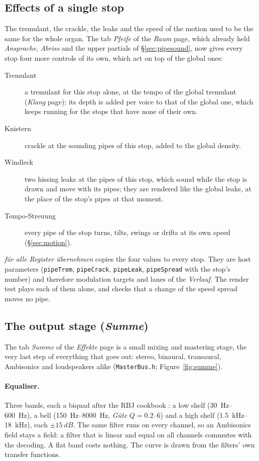 \documentclass[11pt,a4paper,parskip=half,DIV=11,toc=bibliography]{scrartcl}
\newcommand{\ui}[1]{\emph{#1}}                 %
\newcommand{\fn}[1]{\mbox{\texttt{#1}}}
\begin{document}
\subsection{Effects of a single stop}
\label{sec:stopfx}
The tremulant, the crackle, the leaks and the speed of the motion used to be the same for the whole organ. The tab \ui{Pfeife} of the \ui{Raum} page,
which already held \ui{Ansprache}, \ui{Abriss} and the upper partials of \S\ref{sec:pipesound}, now gives every stop four more controls of its own,
which act on top of the global ones:
\begin{description}
  \item[Tremulant] a tremulant for this stop alone, at the tempo of the global tremulant (\ui{Klang} page); its depth is added per voice to that of the
        global one, which keeps running for the stops that have none of their own.
  \item[Knistern] crackle at the sounding pipes of this stop, added to the global density.
  \item[Windleck] two hissing leaks at the pipes of this stop, which sound while the stop is drawn and move with its pipes; they are rendered like
        the global leaks, at the place of the stop's pipes at that moment.
  \item[Tempo-Streuung] every pipe of the stop turns, tilts, swings or drifts at its own speed (\S\ref{sec:motion}).
\end{description}
\ui{für alle Register übernehmen} copies the four values to every stop. They are host parameters (\fn{pipeTrem}, \fn{pipeCrack}, \fn{pipeLeak},
\fn{pipeSpread} with the stop's number) and therefore modulation targets and lanes of the \ui{Verlauf}. The render test plays each of them alone,
and checks that a change of the speed spread moves no pipe.

\subsection{The output stage (\ui{Summe})}
\label{sec:summe}
The tab \ui{Summe} of the \ui{Effekte} page is a small mixing and mastering stage, the very last step of everything that goes out: stereo,
binaural, transaural, Ambisonics and loudspeakers alike (\fn{MasterBus.h}; Figure~\ref{fig:summe}).
\paragraph{Equaliser.} Three bands, each a biquad after the RBJ cookbook \citep{rbj}: a low shelf (\SIrange{30}{600}{Hz}), a bell
(\SIrange{150}{8000}{Hz}, \ui{Güte} $Q=0.2$--6) and a high shelf (\SIrange{1.5}{18}{kHz}), each $\pm\SI{15}{dB}$. The same filter runs on every
channel, so an Ambisonics field stays a field: a filter that is linear and equal on all channels commutes with the decoding. A flat band costs nothing.
The curve is drawn from the filters' own transfer functions.
\end{document}

